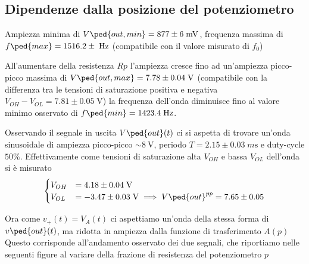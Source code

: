 \documentclass[10pt, a4paper, italian]{article}
\begin{document}
\subsection{Dipendenze dalla posizione del potenziometro}
Ampiezza minima di $V\ped{out, min} = 877 \pm 6 \; \si{m\V}$, frequenza massima di
$f\ped{max} = 1516.2 \pm \; \si{\Hz}$ (compatibile con il valore misurato di $f_0$)

All'aumentare della resistenza $Rp$ l'ampiezza cresce fino ad un'ampiezza
picco-picco massima di $V\ped{out, max} = 7.78 \pm 0.04 \; \si{\V}$
(compatibile con la differenza tra le tensioni di saturazione positiva e
negativa $V_{OH} - V_{OL} = 7.81 \pm 0.05 \; \si{\V}$)
la frequenza dell'onda diminuisce fino al valore minimo osservato di
$f\ped{min} = 1423.4 \; \si{\Hz}$.


Osservando il segnale in uscita $V\ped{out} (t)$ ci si aspetta di trovare
un'onda sinusoidale di ampiezza picco-picco $\sim \SI{8}{\V}$, periodo
$T = 2.15 \pm 0.03 \; \si{m\s}$ e duty-cycle $50 \%$. Effettivamente come
tensioni di saturazione alta $V_{OH}$ e bassa $V_{OL}$ dell'onda si è misurato
\begin{align*}
\begin{cases}
V_{OH} &= 4.18 \pm 0.04 \; \si{\V} \\
V_{OL} &= -3.47 \pm 0.03 \; \si{\V}  \implies V\ped{out}^{pp} = 7.65 \pm 0.05
\end{cases}
\end{align*}

Ora come $v_+ (t) = V_A (t)$ ci aspettiamo un'onda della stessa forma di
$v\ped{out} (t)$, ma ridotta in ampiezza dalla funzione di trasferimento $A(p)$
Questo corrisponde all'andamento osservato dei due segnali, che riportiamo
nelle seguenti figure al variare della frazione di resistenza del potenziometro
$p$ 
\end{document}
